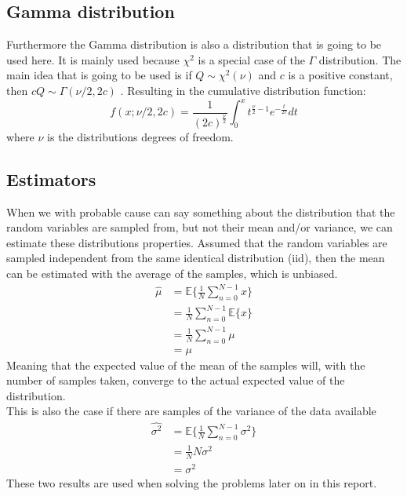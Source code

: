 \subsection{Gamma distribution}
Furthermore the Gamma distribution is also a distribution that is going to be used here. It is mainly used because $\chi^2$ is a special case of the $\Gamma$ distribution. The main idea that is going to be used is if $Q\sim\chi^2(\nu)$ and $c$ is a positive constant, then $cQ\sim\Gamma(\nu/2, 2c)$ \cite{WikipediaGamma}. Resulting in the cumulative distribution function:
\begin{equation}
    f(x; \nu/2, 2c) = \frac{1}{(2c)^{\frac{\nu}{2}}}\int_{0}^{x}t^{\frac{\nu}{2}-1}e^{-\frac{t}{2c}}dt
\end{equation}
where $\nu$ is the distributions degrees of freedom.

\subsection{Estimators}
When we with probable cause can say something about the distribution that the random variables are sampled from, but not their mean and/or variance, we can estimate these distributions properties. Assumed that the random variables are sampled independent from the same identical distribution (iid), then the mean can be estimated with the average of the samples, which is unbiased.
\begin{align}
	\hat{\mu} & = \mathbb{E}\{\frac{1}{N}\sum_{n=0}^{N-1}x\}\nonumber\\
	& = \frac{1}{N}\sum_{n=0}^{N-1}\mathbb{E}\{x\}\nonumber\\
	& = \frac{1}{N}\sum_{n=0}^{N-1}\mu\nonumber\\
	& = \mu\label{eq:mu_est}
\end{align}
Meaning that the expected value of the mean of the samples will, with the number of samples taken, converge to the actual expected value of the distribution.\\
This is also the case if there are samples of the variance of the data available
\begin{align}
	\hat{\sigma^2} & = \mathbb{E}\{\frac{1}{N}\sum_{n=0}^{N-1}\sigma^2\}\nonumber\\
	& = \frac{1}{N}N\sigma^2\nonumber\\
	& = \sigma^2\label{eq:sigma_est}
\end{align}
These two results are used when solving the problems later on in this report.

